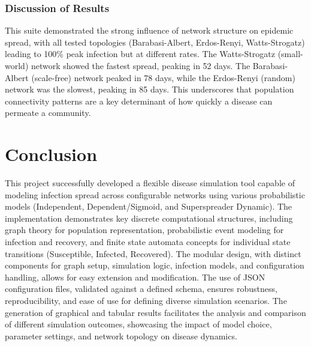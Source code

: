 \documentclass[12pt]{article}
\begin{document}
\subsubsection*{Discussion of Results}
This suite demonstrated the strong influence of network structure on epidemic spread, with all tested topologies (Barabasi-Albert, Erdos-Renyi, Watts-Strogatz) leading to 100\% peak infection but at different rates. The Watts-Strogatz (small-world) network showed the fastest spread, peaking in 52 days. The Barabasi-Albert (scale-free) network peaked in 78 days, while the Erdos-Renyi (random) network was the slowest, peaking in 85 days. This underscores that population connectivity patterns are a key determinant of how quickly a disease can permeate a community.

\section{Conclusion} This project successfully developed a flexible disease simulation tool capable of modeling infection spread across configurable networks using various probabilistic models (Independent, Dependent/Sigmoid, and Superspreader Dynamic). The implementation demonstrates key discrete computational structures, including graph theory for population representation, probabilistic event modeling for infection and recovery, and finite state automata concepts for individual state transitions (Susceptible, Infected, Recovered). The modular design, with distinct components for graph setup, simulation logic, infection models, and configuration handling, allows for easy extension and modification. The use of JSON configuration files, validated against a defined schema, ensures robustness, reproducibility, and ease of use for defining diverse simulation scenarios. The generation of graphical and tabular results facilitates the analysis and comparison of different simulation outcomes, showcasing the impact of model choice, parameter settings, and network topology on disease dynamics.

\appendix
\end{document}
